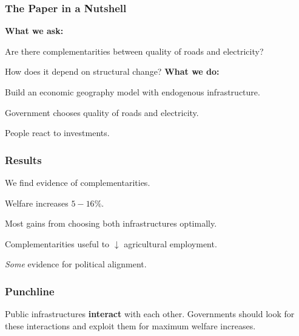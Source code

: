 \documentclass[11pt,xcolor={svgnames},aspectratio=169,usepdftitle=false]{beamer}
\let\toneitemize\itemize
\let\ttwoitemize\enditemize
\renewenvironment{itemize}{\toneitemize\addtolength{\itemsep}{1.05\baselineskip}}{\ttwoitemize}
\begin{document}
\begin{frame}
    \frametitle{The Paper in a Nutshell}
\alert{\textbf{What we ask:}}
\begin{itemize}
    \item Are there complementarities between quality of roads and electricity?
    \item How does it depend on structural change?
\end{itemize}
\alert{\textbf{What we do:}}
\begin{itemize}
    \item Build an economic geography model with endogenous infrastructure.
    \item Government chooses quality of roads and electricity.
    \item People react to investments.
\end{itemize}
\end{frame}

\begin{frame}
    \frametitle{Results}
\begin{itemize}
    \item We find evidence of complementarities.
    \item Welfare increases $5-16\%$.
    \item Most gains from choosing \alert{both infrastructures} optimally.
    \item Complementarities useful to $\downarrow$ agricultural employment.
    \item \alert{\textit{Some}} evidence for political alignment.
\end{itemize}
\end{frame}

\begin{frame}
    \frametitle{Punchline}

\begin{block}{}
Public infrastructures \alert{\textbf{interact}} with each other. Governments should look for these interactions and exploit them for maximum welfare increases.
\end{block}

\end{frame}
\end{document}
